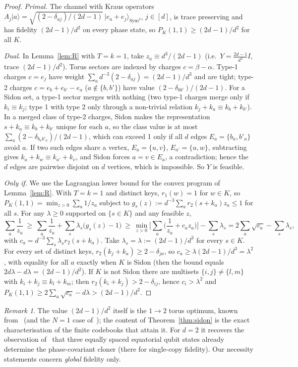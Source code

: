 \documentclass[11pt]{article}
\newcommand{\Sym}{\operatorname{Sym}}
\newcommand{\ket}[1]{\lvert #1\rangle}
\theoremstyle{definition}
\theoremstyle{remark}
\newtheorem{remark}[theorem]{Remark}
\begin{document}
\begin{proof}
\emph{Primal.} The channel with Kraus operators $A_j\ket a=\sqrt{(2-\delta_{aj})/(2d-1)}\,\ket{e_a+e_j}_{\Sym^2}$, $j\in[d]$, is
trace preserving and has fidelity $(2d-1)/d^2$ on every phase state, so $P_K(1,1)\ge(2d-1)/d^2$ for all $K$.

\emph{Dual.} In Lemma~\ref{lem:R} with $T=k=1$, take $z_a\equiv d^3/(2d-1)$ (i.e.\ $Y=\frac{2d-1}{d^3}I$, trace $(2d-1)/d^2$). Torus
sectors are indexed by charges $c=\beta-\alpha$. Type-1 charges $c=e_j$ have weight $\sum_a d^{-3}(2-\delta_{aj})=(2d-1)/d^3$ and
are tight; type-2 charges $c=e_b+e_{b'}-e_a$ ($a\notin\{b,b'\}$) have value $(2-\delta_{bb'})/(2d-1)$. For a Sidon set, a type-1
sector merges with nothing (two type-1 charges merge only if $k_i\equiv k_j$; type 1 with type 2 only through a non-trivial
relation $k_j+k_a\equiv k_b+k_{b'}$). In a merged class of type-2 charges, Sidon makes the representation $s+k_a\equiv k_b+k_{b'}$
unique for each $a$, so the class value is at most $\sum_a(2-\delta_{b_ab'_a})/(2d-1)$, which can exceed 1 only if all $d$ edges
$E_a=\{b_a,b'_a\}$ avoid $a$. If two such edges share a vertex, $E_a=\{u,v\}$, $E_{a'}=\{u,w\}$, subtracting gives
$k_a+k_w\equiv k_{a'}+k_v$, and Sidon forces $a=v\in E_a$, a contradiction; hence the $d$ edges are pairwise disjoint on
$d$ vertices, which is impossible. So $Y$ is feasible.

\emph{Only if.} We use the Lagrangian lower bound for the convex program of Lemma~\ref{lem:R}. With $T=k=1$ and distinct keys,
$r_1(w)=1$ for $w\in K$, so $P_K(1,1)=\min_{z>0}\sum_a 1/z_a$ subject to $g_s(z):=d^{-3}\sum_a r_2(s+k_a)z_a\le1$ for all $s$. For any
$\lambda\ge0$ supported on $\{s\in K\}$ and any feasible $z$,
\[
\sum_a\frac1{z_a}\ \ge\ \sum_a\frac1{z_a}+\sum_{s}\lambda_s\big(g_s(z)-1\big)\ \ge\ \min_{z>0}\Big[\sum_a\Big(\frac1{z_a}+c_a z_a\Big)\Big]-\sum_s\lambda_s
=2\sum_a\sqrt{c_a}-\sum_s\lambda_s ,
\]
with $c_a=d^{-3}\sum_{s}\lambda_s r_2(s+k_a)$. Take $\lambda_s=\lambda:=(2d-1)/d^3$ for every $s\in K$. For every set of distinct keys,
$r_2(k_j+k_a)\ge2-\delta_{ja}$, so $c_a\ge\lambda(2d-1)/d^3=\lambda^2$, with equality for all $a$ exactly when $K$ is Sidon (then the
bound equals $2d\lambda-d\lambda=(2d-1)/d^2$). If $K$ is not Sidon there are multisets $\{i,j\}\ne\{l,m\}$ with
$k_i+k_j\equiv k_l+k_m$; then $r_2(k_i+k_j)>2-\delta_{ij}$, hence $c_i>\lambda^2$ and $P_K(1,1)\ge2\sum_a\sqrt{c_a}-d\lambda>(2d-1)/d^2$.
\end{proof}

\begin{remark}
The value $(2d-1)/d^2$ itself is the $1\to2$ torus optimum, known from~\cite{KimChitambar2022} (and the $N=1$ case
of~\cite[Eq.~(16)]{Herasymenko2026}); the content of Theorem~\ref{thm:sidon} is the exact characterisation of the finite codebooks that
attain it. For $d=2$ it recovers the observation of~\cite{Jing2012} that three equally spaced equatorial qubit states already
determine the phase-covariant cloner (there for single-copy fidelity). Our necessity statements concern \emph{global} fidelity only.
\end{remark}
\end{document}
